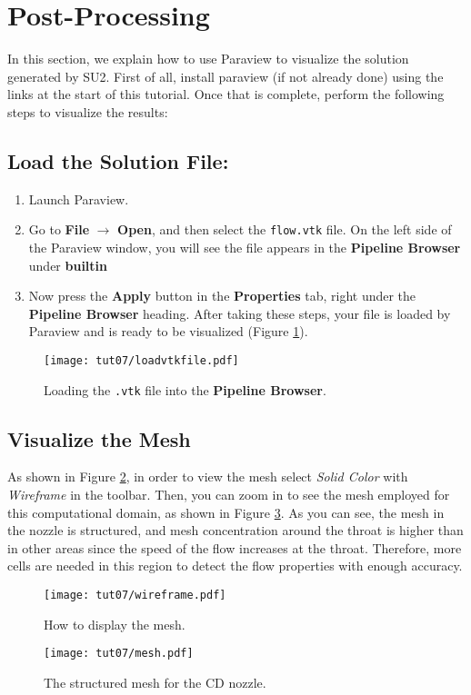 \section{Post-Processing}
In this section, we explain how to use Paraview to visualize the solution generated by SU2. First of all, install paraview (if not already done) using the links at the start of this tutorial. Once that is complete, perform the following steps to visualize the results:
\subsection{Load the Solution File:}
\begin{enumerate}[label=\arabic*)]
	\item Launch Paraview.
	\item Go to \textbf{File} $\rightarrow$ \textbf{Open}, and then select the \texttt{flow.vtk} file. On the left side of the Paraview window, you will see the file appears in the \textbf{Pipeline Browser} under \textbf{builtin}
	\item Now press the \textbf{Apply} button in the \textbf{Properties} tab, right under the \textbf{Pipeline Browser} heading. After taking these steps, your file is loaded by Paraview and is ready to be visualized (Figure \ref{fig7:load}).
\end{enumerate}
\begin{figure}[ht]
	\centering
	\texttt{[image: tut07/loadvtkfile.pdf]}
	\caption{Loading the \texttt{.vtk} file into the \textbf{Pipeline Browser}.}
	\label{fig7:load}
\end{figure}
\subsection{Visualize the Mesh}
As shown in Figure \ref{fig7:wireframe}, in order to view the mesh select \textit{Solid Color} with \textit{Wireframe} in the toolbar. Then, you can zoom in to see the mesh employed for this computational domain, as shown in Figure \ref{fig7:mesh}. As you can see, the mesh in the nozzle is structured, and mesh concentration around the throat is higher than in other areas since the speed of the flow increases at the throat. Therefore, more cells are needed in this region to detect the flow properties with enough accuracy.
\begin{figure}[ht]
	\centering
	\texttt{[image: tut07/wireframe.pdf]}
	\caption{How to display the mesh.}
	\label{fig7:wireframe}
\end{figure}
\begin{figure}[ht]
	\centering
	\texttt{[image: tut07/mesh.pdf]}
	\caption{The structured mesh for the CD nozzle.}
	\label{fig7:mesh}
\end{figure}

